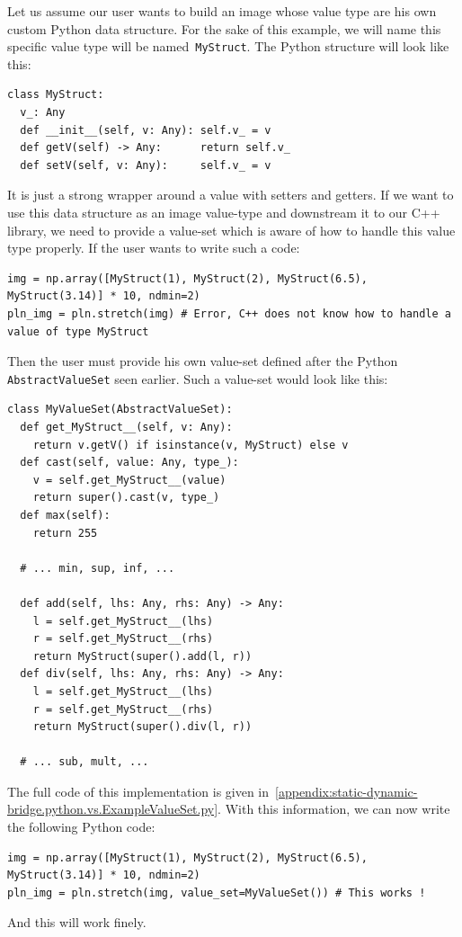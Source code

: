 Let us assume our user wants to build an image whose value type are his own custom Python data structure. For the sake
of this example, we will name this specific value type will be named~\texttt{MyStruct}. The Python structure will look
like this:
\begin{verbatim}
class MyStruct:
  v_: Any
  def __init__(self, v: Any): self.v_ = v
  def getV(self) -> Any:      return self.v_
  def setV(self, v: Any):     self.v_ = v
\end{verbatim}
It is just a strong wrapper around a value with setters and getters. If we want to use this data structure as an image
value-type and downstream it to our C++ library, we need to provide a value-set which is aware of how to handle this
value type properly. If the user wants to write such a code:
\begin{verbatim}
img = np.array([MyStruct(1), MyStruct(2), MyStruct(6.5), MyStruct(3.14)] * 10, ndmin=2)
pln_img = pln.stretch(img) # Error, C++ does not know how to handle a value of type MyStruct
\end{verbatim}
Then the user must provide his own value-set defined after the Python \texttt{AbstractValueSet} seen earlier. Such a
value-set would look like this:
\begin{verbatim}
class MyValueSet(AbstractValueSet):
  def get_MyStruct__(self, v: Any):
    return v.getV() if isinstance(v, MyStruct) else v
  def cast(self, value: Any, type_):
    v = self.get_MyStruct__(value)
    return super().cast(v, type_)
  def max(self):
    return 255

  # ... min, sup, inf, ...

  def add(self, lhs: Any, rhs: Any) -> Any:
    l = self.get_MyStruct__(lhs)
    r = self.get_MyStruct__(rhs)
    return MyStruct(super().add(l, r))
  def div(self, lhs: Any, rhs: Any) -> Any:
    l = self.get_MyStruct__(lhs)
    r = self.get_MyStruct__(rhs)
    return MyStruct(super().div(l, r))

  # ... sub, mult, ...
\end{verbatim}
The full code of this implementation is given in~\cref{appendix:static-dynamic-bridge.python.vs.ExampleValueSet.py}.
With this information, we can now write the following Python code:
\begin{verbatim}
img = np.array([MyStruct(1), MyStruct(2), MyStruct(6.5), MyStruct(3.14)] * 10, ndmin=2)
pln_img = pln.stretch(img, value_set=MyValueSet()) # This works !
\end{verbatim}
And this will work finely.

